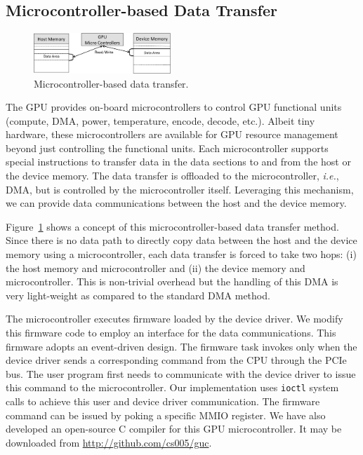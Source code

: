 \subsection{Microcontroller-based Data Transfer}
\label{sec:micro}

\begin{figure}[!t]
 \centering
 \includegraphics[width=0.46\textwidth]{figure/Method/Micro_Method.pdf}
 \caption{Microcontroller-based data transfer.}
 \label{fig:micro}
\end{figure}

The GPU provides on-board microcontrollers to control GPU functional
units (compute, DMA, power, temperature, encode, decode, etc.).
Albeit tiny hardware, these microcontrollers are available for GPU
resource management beyond just controlling the functional units.
Each microcontroller supports special instructions to transfer data in
the data sections to and from the host or the device memory.
The data transfer is offloaded to the microcontroller, \textit{i.e.},
DMA, but is controlled by the microcontroller itself.
Leveraging this mechanism, we can provide data communications between
the host and the device memory.

Figure~\ref{fig:micro} shows a concept of this microcontroller-based
data transfer method.
Since there is no data path to directly copy data between the host and
the device memory using a microcontroller, each data transfer is forced
to take two hops: (i) the host memory and microcontroller and (ii) the
device memory and microcontroller.
This is non-trivial overhead but the handling of this DMA is very
light-weight as compared to the standard DMA method.

The microcontroller executes firmware loaded by the device driver.
We modify this firmware code to employ an interface for the data
communications.
This firmware adopts an event-driven design.
The firmware task invokes only when the device driver sends a
corresponding command from the CPU through the PCIe bus.
The user program first needs to communicate with the device driver
to issue this command to the microcontroller.
Our implementation uses \texttt{ioctl} system calls to achieve this user
and device driver communication.
The firmware command can be issued by poking a specific MMIO register.
We have also developed an open-source C compiler for this GPU
microcontroller.
It may be downloaded from \url{http://github.com/cs005/guc}.

